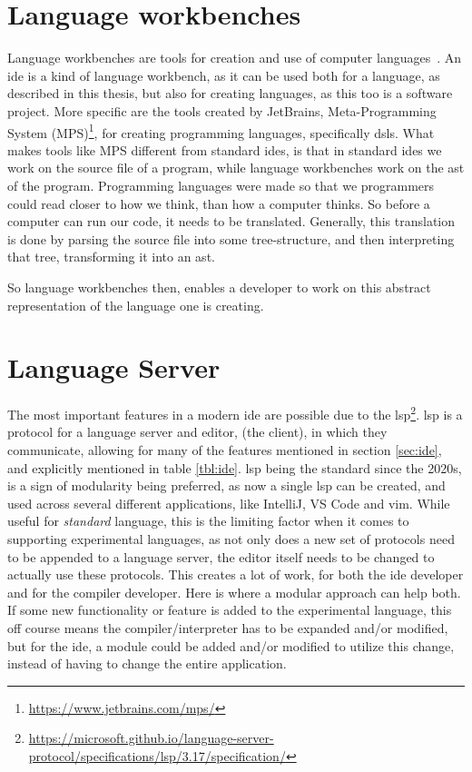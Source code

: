 \section{Language workbenches}

Language workbenches are tools for creation and use of computer languages~\cite{lwb}.
An \gls*{ide} is a kind of language workbench, as it can be used both for a
language, as described in this thesis, but also for creating languages, as this
too is a software project. More specific are the tools created by JetBrains,
Meta-Programming System (MPS)\footnote{\url{https://www.jetbrains.com/mps/}},
for creating programming languages, specifically \gls*{dsl}s. What makes tools
like MPS different from standard \gls*{ide}s, is that in standard \gls*{ide}s we
work on the source file of a program, while language workbenches work on the
\gls*{ast} of the program. Programming languages were made so that we
programmers could read closer to how we think, than how a computer thinks. So
before a computer can run our code, it needs to be translated. Generally, this
translation is done by parsing the source file into some tree-structure, and
then interpreting that tree, transforming it into an \gls*{ast}.

So language workbenches then, enables a developer to work on this abstract
representation of the language one is creating.


\section{Language Server}

The most important features in a modern \gls*{ide} are possible due to the
\gls*{lsp}\footnote{\url{https://microsoft.github.io/language-server-protocol/specifications/lsp/3.17/specification/}}.
\gls*{lsp} is a protocol for a language server and editor, (the client), in
which they communicate, allowing for many of the features mentioned in section
\ref{sec:ide}, and explicitly mentioned in table \ref{tbl:ide}. \gls*{lsp} being
the standard since the 2020s, is a sign of modularity being preferred, as now a
single \gls*{lsp} can be created, and used across several different
applications, like IntelliJ, VS Code and \gls*{vim}. While useful for
\textit{standard} language, this is the limiting factor when it comes to
supporting experimental languages, as not only does a new set of protocols need
to be appended to a language server, the editor itself needs to be changed to
actually use these protocols. This creates a lot of work, for both the
\gls*{ide} developer and for the compiler developer. Here is where a modular
approach can help both. If some new functionality or feature is added to the
experimental language, this off course means the compiler/interpreter has to be
expanded and/or modified, but for the \gls*{ide}, a module could be added and/or
modified to utilize this change, instead of having to change the entire
application.


